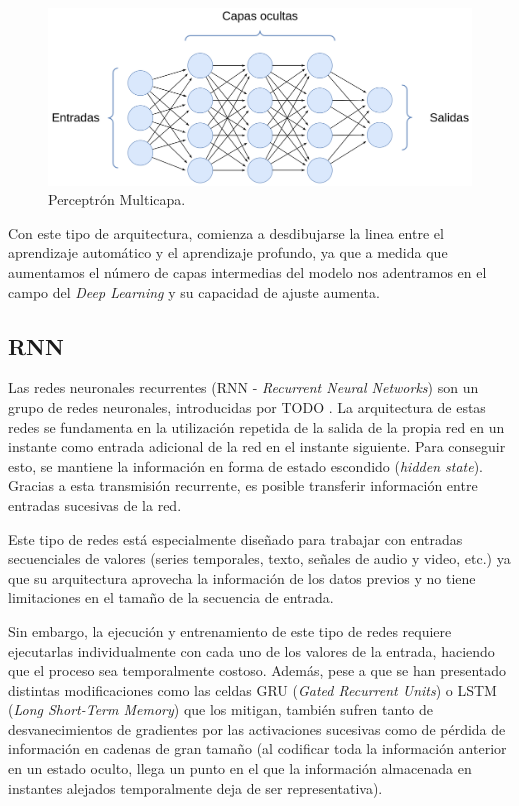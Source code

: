 \begin{figure}[H]
\centering
\includegraphics[width=0.8\linewidth]{imagenes/mlp.png} 
\captionsetup{width=.8\linewidth}
\caption{Perceptrón Multicapa.}
\label{fig:mlp}
\end{figure}

Con este tipo de arquitectura, comienza a desdibujarse la linea entre el aprendizaje automático y el aprendizaje profundo, ya que a medida que aumentamos el número de capas intermedias del modelo nos adentramos en el campo del \textit{Deep Learning} y su capacidad de ajuste aumenta.

\subsection{RNN}
Las redes neuronales recurrentes (RNN - \textit{Recurrent Neural Networks}) son un grupo de redes neuronales, introducidas por TODO \cite{rnn}. La arquitectura de estas redes se fundamenta en la utilización repetida de la salida de la propia red en un instante como entrada adicional de la red en el instante siguiente. Para conseguir esto, se mantiene la información en forma de estado escondido (\textit{hidden state}). Gracias a esta transmisión recurrente, es posible transferir información entre entradas sucesivas de la red.

Este tipo de redes está especialmente diseñado para trabajar con entradas secuenciales de valores (series temporales, texto, señales de audio y video, etc.) ya que su arquitectura aprovecha la información de los datos previos y no tiene limitaciones en el tamaño de la secuencia de entrada.

Sin embargo, la ejecución y entrenamiento de este tipo de redes requiere ejecutarlas individualmente con cada uno de los valores de la entrada, haciendo que el proceso sea temporalmente costoso. Además, pese a que se han presentado distintas modificaciones como las celdas GRU (\textit{Gated Recurrent Units}) \cite{gru} o LSTM (\textit{Long Short-Term Memory}) \cite{lstm} que los mitigan, también sufren tanto de desvanecimientos de gradientes por las activaciones sucesivas como de pérdida de información en cadenas de gran tamaño (al codificar toda la información anterior en un estado oculto, llega un punto en el que la información almacenada en instantes alejados temporalmente deja de ser representativa).

